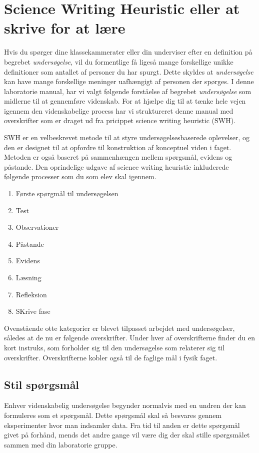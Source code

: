 
\chapter{Science Writing Heuristic eller at skrive for at lære}
 \label{app:A}
 
 Hvis du spørger dine klassekammerater eller din underviser efter en definition på begrebet \emph{undersøgelse}, vil du formentlige få ligeså mange forskellige unikke definitioner som antallet af personer du har spurgt. Dette skyldes at \emph{undersøgelse} kan have mange forskellige meninger uafhængigt af personen der spørges. I denne laboratorie manual, har vi valgt følgende forståelse af begrebet \emph{undersøgelse} som midlerne til at gennemføre videnskab. For at hjælpe dig til at tænke hele vejen igennem den videnskabelige process har vi struktureret denne manual med overskrifter som er draget ud fra pricippet science writing heuristic (SWH).
 
 SWH er en velbeskrevet metode til at styre undersøgelsesbaserede oplevelser, og den er designet til at opfordre til konstruktion af konceptuel viden i faget. Metoden er også baseret på sammenhængen mellem spørgsmål, evidens og påstande. Den oprindelige udgave af science writing heuristic inkluderede følgende processer som du som elev skal igennem.
 
 \begin{enumerate}
 	\item Første spørgmål til undersøgelsen
 	\item Test
 	\item Observationer
 	\item Påstande
 	\item Evidens
 	\item Læsning
 	\item Refleksion
 	\item SKrive fase
\end{enumerate}

Ovenstående otte kategorier er blevet tilpasset arbejdet med undersøgelser, således at de nu er følgende overskrifter. Under hver af overskrifterne finder du en kort instruks, som forholder sig til den undersøgelse som relaterer sig til overskrifter. Overskrifterne kobler også til de faglige mål i fysik faget.

\section{Stil spørgsmål}
\label{sec:SS}
Enhver videnskabelig undersøgelse begynder normalvis med en undren der kan formuleres som et spørgsmål. Dette spørgsmål skal så besvares gennem eksperimenter hvor man indsamler data. Fra tid til anden er dette spørgsmål givet på forhånd, mends det andre gange vil være dig der skal stille spørgsmålet sammen med din laboratorie gruppe.

